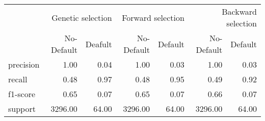 \begin{table}
\thcenter
\begin{tabular}{lrrrrrr}
 & \multicolumn{2}{r}{Genetic selection} & \multicolumn{2}{r}{Forward selection} & \multicolumn{2}{r}{Backward selection} \\
 & No-Default & Deafult & No-Default & Default & No-Default & Default \\
precision & 1.00 & 0.04 & 1.00 & 0.03 & 1.00 & 0.03 \\
recall & 0.48 & 0.97 & 0.48 & 0.95 & 0.49 & 0.92 \\
f1-score & 0.65 & 0.07 & 0.65 & 0.07 & 0.66 & 0.07 \\
support & 3296.00 & 64.00 & 3296.00 & 64.00 & 3296.00 & 64.00 \\
\end{tabular}
\end{table}
